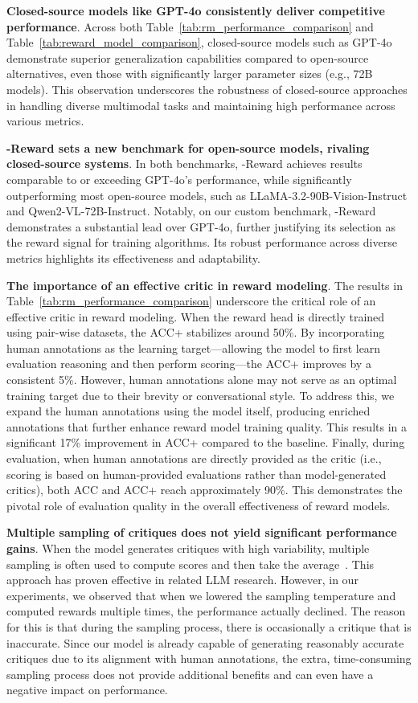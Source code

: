 \textbf{Closed-source models like GPT-4o consistently deliver competitive performance}.
Across both Table~\ref{tab:rm_performance_comparison} and Table~\ref{tab:reward_model_comparison}, closed-source models such as GPT-4o demonstrate superior generalization capabilities compared to open-source alternatives, even those with significantly larger parameter sizes (e.g., 72B models). This observation underscores the robustness of closed-source approaches in handling diverse multimodal tasks and maintaining high performance across various metrics.

\textbf{\abbr-Reward sets a new benchmark for open-source models, rivaling closed-source systems}.
In both benchmarks, \abbr-Reward achieves results comparable to or exceeding GPT-4o's performance, while significantly outperforming most open-source models, such as LLaMA-3.2-90B-Vision-Instruct and Qwen2-VL-72B-Instruct. Notably, on our custom benchmark, \abbr-Reward demonstrates a substantial lead over GPT-4o, further justifying its selection as the reward signal for training algorithms. Its robust performance across diverse metrics highlights its effectiveness and adaptability.

\textbf{The importance of an effective critic in reward modeling}.
The results in Table~\ref{tab:rm_performance_comparison} underscore the critical role of an effective critic in reward modeling. When the reward head is directly trained using pair-wise datasets, the ACC+ stabilizes around 50\%. By incorporating human annotations as the learning target—allowing the model to first learn evaluation reasoning and then perform scoring—the ACC+ improves by a consistent 5\%. However, human annotations alone may not serve as an optimal training target due to their brevity or conversational style. To address this, we expand the human annotations using the model itself, producing enriched annotations that further enhance reward model training quality. This results in a significant 17\% improvement in ACC+ compared to the baseline. Finally, during evaluation, when human annotations are directly provided as the critic (i.e., scoring is based on human-provided evaluations rather than model-generated critics), both ACC and ACC+ reach approximately 90\%. This demonstrates the pivotal role of evaluation quality in the overall effectiveness of reward models.

\textbf{Multiple sampling of critiques does not yield significant performance gains}. When the model generates critiques with high variability, multiple sampling is often used to compute scores and then take the average~\cite{yu2024self}. This approach has proven effective in related LLM research. However, in our experiments, we observed that when we lowered the sampling temperature and computed rewards multiple times, the performance actually declined. The reason for this is that during the sampling process, there is occasionally a critique that is inaccurate. Since our model is already capable of generating reasonably accurate critiques due to its alignment with human annotations, the extra, time-consuming sampling process does not provide additional benefits and can even have a negative impact on performance.


